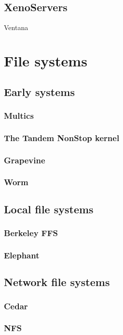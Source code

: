 \subsection{XenoServers}
\cite{kotsovinos}

Ventana \cite{pfaff}

\section{File systems}

\subsection{Early systems}
\subsubsection{Multics}
\cite{corbato}
\subsubsection{The Tandem NonStop kernel}
\cite{bartlett}
\subsubsection{Grapevine}
\cite{birrell82}
\subsubsection{Worm}
\cite{shoch}

\subsection{Local file systems}
\subsubsection{Berkeley FFS}
\subsubsection{Elephant}
\cite{santry}

\subsection{Network file systems}
\subsubsection{Cedar}
\cite{gifford,hagmann}
\subsubsection{NFS}
\cite{sandberg,pawlowski,callaghan}
